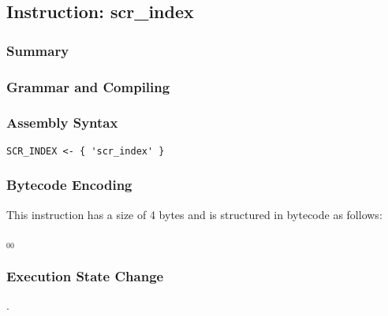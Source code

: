 \subsection{Instruction: scr\_index}

\subsubsection{Summary}


\subsubsection{Grammar and Compiling}


\subsubsection{Assembly Syntax}

\begin{myquote}
\begin{verbatim}
SCR_INDEX <- { 'scr_index' }
\end{verbatim}
\end{myquote}

\subsubsection{Bytecode Encoding}

This instruction has a size of 4 bytes and is structured in bytecode as follows:

$_{00}$\ 


\subsubsection{Execution State Change}

.


